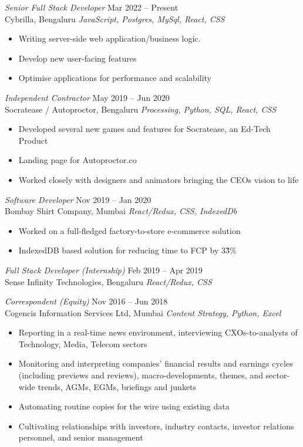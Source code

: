 \documentclass[margin, 10pt]{res} %
\begin{document}
\begin{resume}
{\sl Senior Full Stack Developer} \hfill Mar 2022 – Present \\
Cybrilla, Bengaluru \hfill {\scriptsize \it JavaScript, Postgres, MySql, React, CSS}
\begin{itemize}
\item Writing server-side web application/business logic.
\item Develop new user-facing features
\item Optimise applications for performance and scalability
\end{itemize}

{\sl Independent Contractor} \hfill May 2019 – Jun 2020 \\
Socratease / Autoproctor, Bengaluru \hfill {\scriptsize \it Processing, Python, SQL, React, CSS}
\begin{itemize}
\item Developed several new games and features for Socratease, an Ed-Tech Product
\item Landing page for Autoproctor.co
\item Worked closely with designers and animators bringing the CEOs vision to life 
\end{itemize}

{\sl Software Developer} \hfill Nov 2019 – Jan 2020 \\
Bombay Shirt Company, Mumbai \hfill {\scriptsize \it React/Redux, CSS, IndexedDb}
\begin{itemize}
\item Worked on a full-fledged factory-to-store e-commerce solution
\item IndexedDB based solution for reducing time to FCP by 3\~3\%
\end{itemize}
{\sl Full Stack Developer (Internship)} \hfill Feb 2019 – Apr 2019 \\
Sense Infinity Technologies, Bengaluru \hfill {\scriptsize \it React/Redux, CSS}

{\sl Correspondent (Equity)} \hfill Nov 2016 – Jun 2018 \\
Cogencis Information Services Ltd, Mumbai \hfill {\scriptsize \it Content Strategy, Python, Excel}
\begin{itemize}
\item Reporting in a real-time news environment, interviewing CXOs-to-analysts of Technology, Media, Telecom sectors
\item Monitoring and interpreting companies’ financial results and earnings cycles (including previews and reviews), macro-developments, themes, and sector-wide trends, AGMs, EGMs, briefings and junkets
\item Automating routine copies for the wire using existing data
\item Cultivating relationships with investors, industry contacts, investor relations personnel, and senior management


\end{itemize}
\end{resume}
\end{document}

